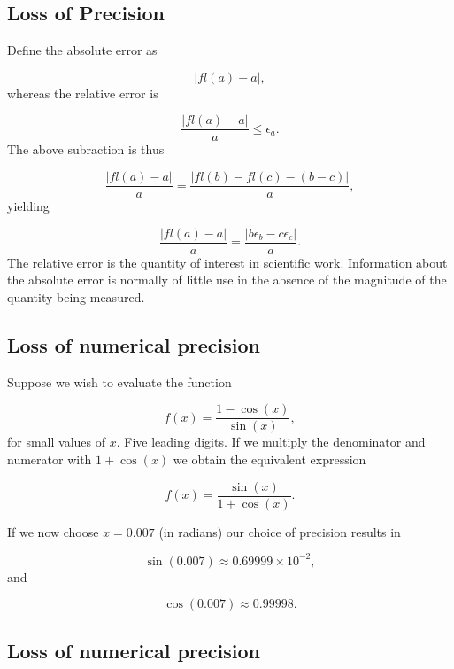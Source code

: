 \documentclass[%
twoside,                 %
final,                   %
10pt]{article}
\newenvironment{block_mdfboxadmon}[1][]{
\begin{block_mdfboxmdframed}[frametitle=#1]
}
{
\end{block_mdfboxmdframed}
}
\begin{document}
\subsection{Loss of Precision}


\begin{block_mdfboxadmon}
Define
the absolute error as

\begin{equation}
   |fl(a)-a|,
\end{equation}
whereas the relative error is

\begin{equation}
   \frac{ |fl(a)-a|}{a} \le \epsilon_a.
\end{equation}
The above subraction is thus

\begin{equation}
   \frac{ |fl(a)-a|}{a}=\frac{ |fl(b)-fl(c)-(b-c)|}{a},
\end{equation}
yielding

\begin{equation}
   \frac{ |fl(a)-a|}{a}=\frac{ |b\epsilon_b- c\epsilon_c|}{a}.
\end{equation}
The relative error
is the quantity of interest in scientific work. Information about the
absolute error is normally of little use in the absence of the magnitude
of the quantity being measured.
\end{block_mdfboxadmon}



\subsection{Loss of numerical precision}

Suppose we wish to evaluate the function

\[
   f(x)=\frac{1-\cos(x)}{\sin(x)},
\]
for small values of $x$. Five leading digits. If we multiply the denominator and numerator
with $1+\cos(x)$ we obtain the equivalent expression

\[
   f(x)=\frac{\sin(x)}{1+\cos(x)}.
\]

If we now choose $x=0.007$ (in radians) our choice of precision results in

\[
   \sin(0.007)\approx 0.69999\times 10^{-2},
\]
and

\[
   \cos(0.007)\approx 0.99998.
\]

\subsection{Loss of numerical precision}
\end{document}
